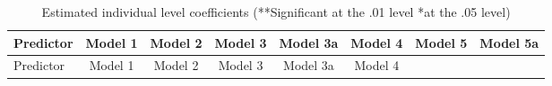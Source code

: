 \documentclass[]{article}
\begin{document}
\begin{longtable}[]{@{}lccccccc@{}}
\caption{Estimated individual level coefficients (**Significant at the
.01 level *at the .05 level)
\label{tab:model_indiv_coef}}\tabularnewline
\toprule
\begin{minipage}[b]{0.12\columnwidth}\raggedright\strut
Predictor\strut
\end{minipage} & \begin{minipage}[b]{0.09\columnwidth}\centering\strut
Model 1\strut
\end{minipage} & \begin{minipage}[b]{0.10\columnwidth}\centering\strut
Model 2\strut
\end{minipage} & \begin{minipage}[b]{0.10\columnwidth}\centering\strut
Model 3\strut
\end{minipage} & \begin{minipage}[b]{0.10\columnwidth}\centering\strut
Model 3a\strut
\end{minipage} & \begin{minipage}[b]{0.10\columnwidth}\centering\strut
Model 4\strut
\end{minipage} & \begin{minipage}[b]{0.10\columnwidth}\centering\strut
Model 5\strut
\end{minipage} & \begin{minipage}[b]{0.10\columnwidth}\centering\strut
Model 5a\strut
\end{minipage}\tabularnewline
\midrule
\endfirsthead
\toprule
\begin{minipage}[b]{0.12\columnwidth}\raggedright\strut
Predictor\strut
\end{minipage} & \begin{minipage}[b]{0.09\columnwidth}\centering\strut
Model 1\strut
\end{minipage} & \begin{minipage}[b]{0.10\columnwidth}\centering\strut
Model 2\strut
\end{minipage} & \begin{minipage}[b]{0.10\columnwidth}\centering\strut
Model 3\strut
\end{minipage} & \begin{minipage}[b]{0.10\columnwidth}\centering\strut
Model 3a\strut
\end{minipage} & \begin{minipage}[b]{0.10\columnwidth}\centering\strut
Model 4\strut
\end{minipage} & \begin{minipage}[b]{0.10\columnwidth}\centering\strut

\end{minipage}
\end{longtable}
\end{document}
